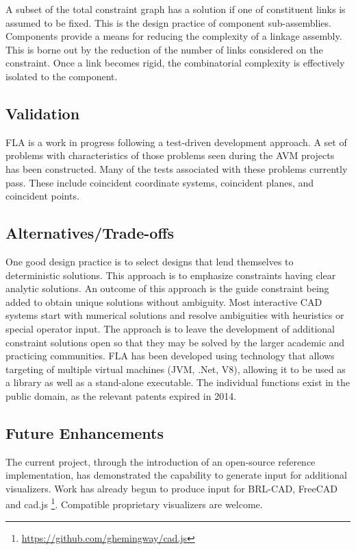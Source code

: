\documentclass[]{report}
\begin{document}
A subset of the total constraint graph has a solution if one of constituent links is assumed to be fixed. 
This is the design practice of component sub-assemblies.
Components provide a means for reducing the complexity of a linkage assembly. This is borne out by the reduction of the number of links considered on the constraint. Once a link becomes rigid, the combinatorial complexity is effectively isolated to the component.

\subsection{Validation} 

FLA is a work in progress following a test-driven development approach. 
A set of problems with characteristics of those problems seen during the AVM projects has been constructed. 
Many of the tests associated with these problems currently pass. 
These include coincident coordinate systems, coincident planes, and coincident points.
 
\subsection{Alternatives/Trade-offs}

One good design practice is to select designs that lend themselves to deterministic solutions. 
This approach is to emphasize constraints having clear analytic solutions. 
An outcome of this approach is the guide constraint being added to obtain unique solutions without ambiguity.
Most interactive CAD systems start with numerical solutions and resolve ambiguities 
with heuristics or special operator input. The approach is to leave 
the development of additional constraint solutions open so that they
may be solved by the larger academic and practicing communities. 
FLA has been developed using technology that allows targeting 
of multiple virtual machines (JVM, .Net, V8), allowing it 
to be used as a library as well as a stand-alone executable. 
The individual functions exist in the public domain, as the relevant patents expired in 2014.

\subsection{Future Enhancements}

The current project, through the introduction of an open-source reference implementation, 
has demonstrated the capability to generate input for additional visualizers. 
Work has already begun to produce input for BRL-CAD, FreeCAD and cad.js \footnote{\url{https://github.com/ghemingway/cad.js}}. 
Compatible proprietary visualizers are welcome.
\end{document}
